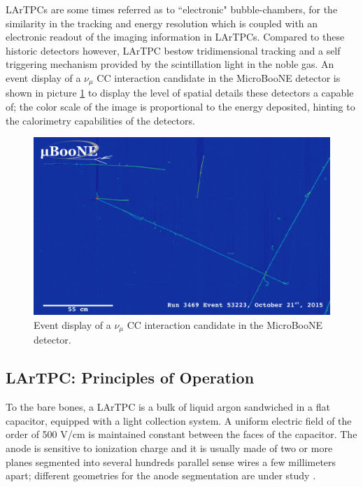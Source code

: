 LArTPCs are some times referred as to ``electronic" bubble-chambers, for the similarity in the tracking and energy resolution which is coupled with an electronic readout of the imaging information in LArTPCs. Compared to these historic detectors however, LArTPC bestow tridimensional tracking and a self triggering mechanism provided by the scintillation light in the noble gas.  An event display of a $\nu_\mu$ CC interaction candidate in the MicroBooNE detector is shown in picture \ref{fig:NuEvd} to display the level of spatial details these detectors a capable of; the color scale of the image is proportional to the energy deposited, hinting to the calorimetry capabilities of the detectors.
\begin{figure}[hbpt]
\centering
\includegraphics[width=\textwidth]{Chapter-2/Images/run3469_subrun1064_event53223_col.pdf}
\caption{Event display of a $\nu_\mu$ CC interaction candidate in the MicroBooNE detector.}
\label{fig:NuEvd}
\end{figure}



\subsection{LArTPC: Principles of Operation}\label{sec:LArTPCWorkingPrinciple}


To the bare bones, a LArTPC is a bulk of liquid argon sandwiched in a flat capacitor, equipped with a light collection system. A uniform electric field of the order of 500 V/cm is maintained constant between the faces of the capacitor. The anode is sensitive to ionization charge and it is usually made of two or more planes segmented into several hundreds parallel sense wires a few millimeters apart; different geometries for the anode segmentation are under study \cite{1748-0221-8-07-P07002}. 

